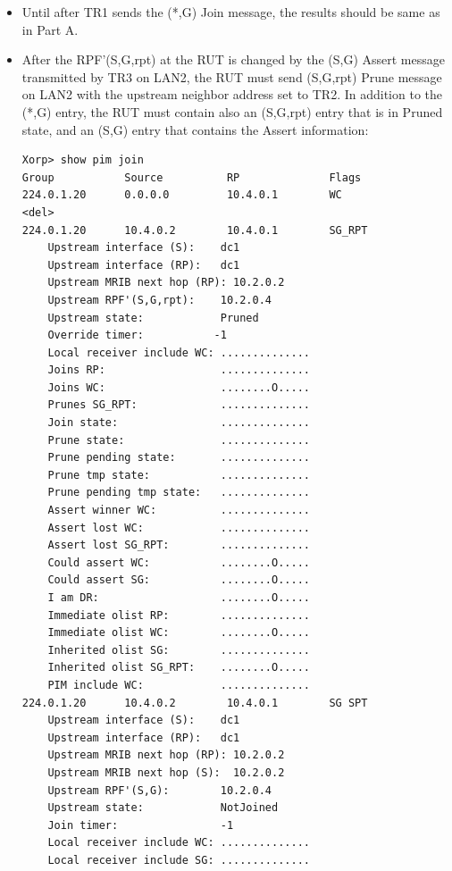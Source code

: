 \documentclass[11pt]{report}
\begin{document}

\begin{itemize}

  \item Until after TR1 sends the (*,G) Join message, the results should be
  same as in Part A.

  \item After the RPF'(S,G,rpt) at the RUT is changed by the (S,G) Assert
  message transmitted by TR3 on LAN2, the RUT must send
  (S,G,rpt) Prune message on LAN2 with the upstream neighbor address set to
  TR2. In addition to the (*,G) entry, the RUT must contain also an (S,G,rpt)
  entry that is in Pruned state, and an (S,G) entry that contains the Assert
  information:

\begin{verbatim}
Xorp> show pim join 
Group           Source          RP              Flags
224.0.1.20      0.0.0.0         10.4.0.1        WC   
<del>
224.0.1.20      10.4.0.2        10.4.0.1        SG_RPT 
    Upstream interface (S):    dc1
    Upstream interface (RP):   dc1
    Upstream MRIB next hop (RP): 10.2.0.2
    Upstream RPF'(S,G,rpt):    10.2.0.4
    Upstream state:            Pruned 
    Override timer:           -1
    Local receiver include WC: ..............
    Joins RP:                  ..............
    Joins WC:                  ........O.....
    Prunes SG_RPT:             ..............
    Join state:                ..............
    Prune state:               ..............
    Prune pending state:       ..............
    Prune tmp state:           ..............
    Prune pending tmp state:   ..............
    Assert winner WC:          ..............
    Assert lost WC:            ..............
    Assert lost SG_RPT:        ..............
    Could assert WC:           ........O.....
    Could assert SG:           ........O.....
    I am DR:                   ........O.....
    Immediate olist RP:        ..............
    Immediate olist WC:        ........O.....
    Inherited olist SG:        ..............
    Inherited olist SG_RPT:    ........O.....
    PIM include WC:            ..............
224.0.1.20      10.4.0.2        10.4.0.1        SG SPT 
    Upstream interface (S):    dc1
    Upstream interface (RP):   dc1
    Upstream MRIB next hop (RP): 10.2.0.2
    Upstream MRIB next hop (S):  10.2.0.2
    Upstream RPF'(S,G):        10.2.0.4
    Upstream state:            NotJoined 
    Join timer:                -1
    Local receiver include WC: ..............
    Local receiver include SG: ..............

\end{verbatim}
\end{itemize}
\end{document}
